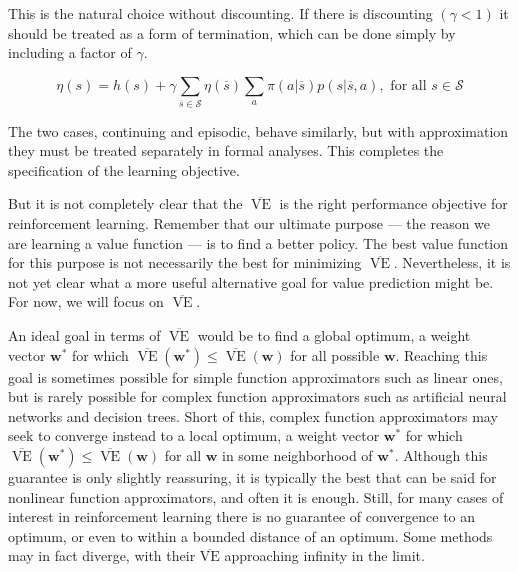 \documentclass{article}
\begin{document}
This is the natural choice without discounting. If there is discounting $( \gamma < 1 )$ it should be treated as a form of termination, which can be done simply by including a factor of $\gamma$.

$$
\eta ( s ) = h ( s ) + \gamma \sum _ { \overline { s } \in \mathcal { S }} \eta ( \overline { s } ) \sum _ { a } \pi ( a | \overline { s } ) p ( s | \overline { s } , a ) , \text { for all } s \in \mathcal { S }
$$

The two cases, continuing and episodic, behave similarly, but with approximation they must be treated separately in formal analyses. This completes the specification of the learning objective.

But it is not completely clear that the $\overline { { \operatorname { V E } } }$ is the right performance objective for reinforcement learning. Remember that our ultimate purpose — the reason we are learning a value function — is to find a better policy. 
The best value function for this purpose is not necessarily the best for minimizing $\overline { { \operatorname { V E } } }$. Nevertheless, it is not yet clear what a more useful alternative goal for value prediction might be. For now, we will focus on $\overline { { \operatorname { V E } } }$.

An ideal goal in terms of $\overline { \operatorname { V E } }$ would be to find a global optimum, a weight vector $\mathbf { w } ^ { * }$ for which $\overline { \operatorname { V E } } ( \mathbf { w } ^ { * } ) \leq \overline { { \operatorname { V E } } } ( \mathbf { w } )$ 
for all possible $\mathbf { w }$. Reaching this goal is sometimes possible for simple function approximators such as linear ones, but is rarely possible for complex function approximators such as artificial neural networks and decision trees. 
Short of this, complex function approximators may seek to converge instead to a local optimum, a weight vector $\mathbf { w } ^ { * }$ for which $\overline { { \operatorname { V E } } } ( \mathbf { w } ^ { * } ) \leq \overline { { \operatorname { V E } } } ( \mathbf { w } )$ 
for all $\mathbf { w }$ in some neighborhood of $\mathbf { w } ^ { * }$. Although this guarantee is only slightly reassuring, it is typically the best that can be said for nonlinear function approximators, and often it is enough. 
Still, for many cases of interest in reinforcement learning there is no guarantee of convergence to an optimum, or even to within a bounded distance of an optimum. Some methods may in fact diverge, with their $\overline { { \mathrm { V E } } }$ approaching infinity in the limit.
\end{document}
